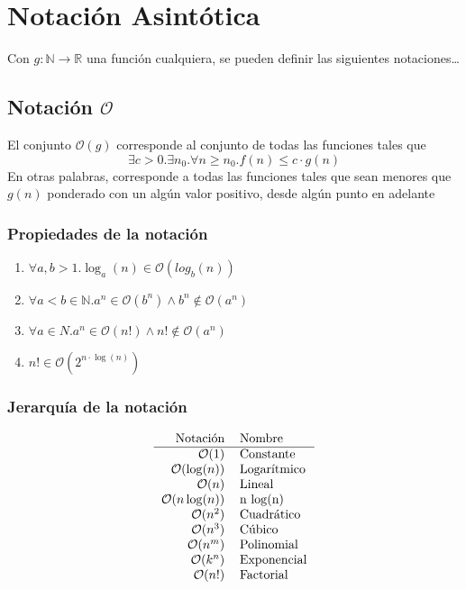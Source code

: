 \documentclass[../main.tex]{subfiles}
\begin{document}
\section{Notación Asintótica}
Con $g: \mathds{N} \rightarrow \mathds{R}$ una función cualquiera, se pueden definir las siguientes notaciones\dots
\subsection[Notación O]{Notación $\mathcal{O}$}
El conjunto $\mathcal{O}(g)$ corresponde al conjunto de todas las funciones tales que
\[ \exists c > 0 . \exists n_0 . \forall n \geq n_0 . f(n) \leq c \cdot g(n) \]
En otras palabras, corresponde a todas las funciones tales que sean menores que $g(n)$ ponderado con un algún valor positivo, desde algún punto en adelante

\subsubsection{Propiedades de la notación}
\begin{enumerate}
    \item $\forall a,b > 1 . \log_a(n) \in \mathcal{O}(log_b(n))$
    \item $\forall a < b \in \mathds{N} . a^n \in \mathcal{O}(b^n) \wedge b^n \not\in \mathcal{O}(a^n)$
    \item $\forall a \in N . a^n \in \mathcal{O}(n!) \wedge n! \not\in \mathcal{O}(a^n)$
    \item $n! \in \mathcal{O}(2^{n \cdot \log(n)})$
\end{enumerate}
\subsubsection{Jerarquía de la notación}
\[
    \begin{tabular}{rl}
        Notación & Nombre \\ \hline
        $\mathcal{O}(1)$         & Constante \\
        $\mathcal{O}(\log(n))$   & Logarítmico \\
        $\mathcal{O}(n)$         & Lineal \\
        $\mathcal{O}(n \log(n))$ & n $\log$(n) \\
        $\mathcal{O}(n^2)$       & Cuadrático \\
        $\mathcal{O}(n^3)$       & Cúbico \\
        $\mathcal{O}(n^m)$       & Polinomial \\
        $\mathcal{O}(k^n)$       & Exponencial \\
        $\mathcal{O}(n!)$        & Factorial \\
        
    \end{tabular}
\]
\end{document}
